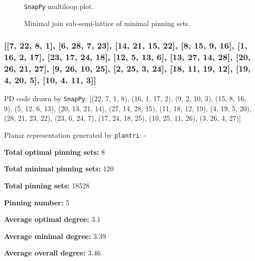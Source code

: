 \documentclass{article}%
\begin{document}
\begin{multicols}{2}
\begin{figure}[H]
\centering

\caption{\texttt{SnapPy} multiloop plot.}
\label{fig:tex/img/[[8, 24, 1, 9], [9, 25, 10, 28], [7, 27, 8, 28], [23, 26, 24, 27], [1, 26, 2, 25], [10, 15, 11, 16], [16, 6, 17, 7], [17, 22, 18, 23], [2, 18, 3, 19], [19, 14, 20, 15], [11, 5, 12, 6], [12, 21, 13, 22.svg}
\end{figure}
\columnbreak

\begin{figure}[H]
\centering
\scalebox{0.8}{}
\caption{Minimal join sub-semi-lattice of minimal pinning sets.}
\label{fig:tex/img/[[8, 24, 1, 9], [9, 25, 10, 28], [7, 27, 8, 28], [23, 26, 24, 27], [1, 26, 2, 25], [10, 15, 11, 16], [16, 6, 17, 7], [17, 22, 18, 23], [2, 18, 3, 19], [19, 14, 20, 15], [11, 5, 12, 6], [12, 21, 13, 22.pgf}
\end{figure}
\end{multicols}

\newpage

\subsubsection{[[7, 22, 8, 1], [6, 28, 7, 23], [14, 21, 15, 22], [8, 15, 9, 16], [1, 16, 2, 17], [23, 17, 24, 18], [12, 5, 13, 6], [13, 27, 14, 28], [20, 26, 21, 27], [9, 26, 10, 25], [2, 25, 3, 24], [18, 11, 19, 12], [19, 4, 20, 5], [10, 4, 11, 3]]}

{\small\noindent PD code drawn by \texttt{SnapPy}: [(22, 7, 1, 8), (16, 1, 17, 2), (9, 2, 10, 3), (15, 8, 16, 9), (5, 12, 6, 13), (20, 13, 21, 14), (27, 14, 28, 15), (11, 18, 12, 19), (4, 19, 5, 20), (28, 21, 23, 22), (23, 6, 24, 7), (17, 24, 18, 25), (10, 25, 11, 26), (3, 26, 4, 27)]}

{\small\noindent Planar representation generated by \texttt{plantri}: -}

\begin{multicols}{2}
{\normalsize \noindent\textbf{Total optimal pinning sets:} 8

\noindent\textbf{Total minimal pinning sets:} 120

\noindent\textbf{Total pinning sets:} 18528

\noindent\textbf{Pinning number:} 5

}
\columnbreak

{\normalsize \noindent\textbf{Average optimal degree:} 3.1

\noindent\textbf{Average minimal degree:} 3.39

\noindent\textbf{Average overall degree:} 3.46

}
\end{multicols}
\end{document}
